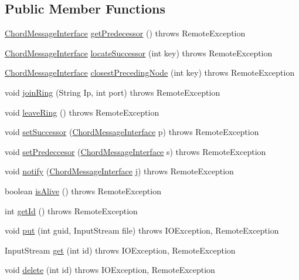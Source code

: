 \subsection*{Public Member Functions}
\begin{DoxyCompactItemize}
\item 
\hyperlink{interface_chord_message_interface}{Chord\+Message\+Interface} \hyperlink{interface_chord_message_interface_ab07c08ba6088ef880eaf4ebae8281c51}{get\+Predecessor} ()  throws Remote\+Exception
\item 
\hyperlink{interface_chord_message_interface}{Chord\+Message\+Interface} \hyperlink{interface_chord_message_interface_a4e299d4b05537a4a07965dfe9f261fd0}{locate\+Successor} (int key)  throws Remote\+Exception
\item 
\hyperlink{interface_chord_message_interface}{Chord\+Message\+Interface} \hyperlink{interface_chord_message_interface_a7f47e9d5144a2af6904135bc05dfe8fd}{closest\+Preceding\+Node} (int key)  throws Remote\+Exception
\item 
void \hyperlink{interface_chord_message_interface_abc5a9483416a6b8ae7330b324869e236}{join\+Ring} (String Ip, int port)  throws Remote\+Exception
\item 
void \hyperlink{interface_chord_message_interface_a6afa0f7ae38d68a936a85216fe33d5ae}{leave\+Ring} ()  throws Remote\+Exception
\item 
void \hyperlink{interface_chord_message_interface_af6194ad846851fe7a8bd5f6bc8d36163}{set\+Successor} (\hyperlink{interface_chord_message_interface}{Chord\+Message\+Interface} p)  throws Remote\+Exception
\item 
void \hyperlink{interface_chord_message_interface_a28e2eda3267e1eaa8abec8adcf2604bb}{set\+Predeccesor} (\hyperlink{interface_chord_message_interface}{Chord\+Message\+Interface} s)  throws Remote\+Exception
\item 
void \hyperlink{interface_chord_message_interface_abbb77f94541073d79284d35f970e0eb4}{notify} (\hyperlink{interface_chord_message_interface}{Chord\+Message\+Interface} j)  throws Remote\+Exception
\item 
boolean \hyperlink{interface_chord_message_interface_a8165b3fb53905e657c70b66223197561}{is\+Alive} ()  throws Remote\+Exception
\item 
int \hyperlink{interface_chord_message_interface_acead95d9a7196f05b656462ab78138eb}{get\+Id} ()  throws Remote\+Exception
\item 
void \hyperlink{interface_chord_message_interface_a59a01f2e913b6b2e4b60ba0b77c90eba}{put} (int guid, Input\+Stream file)  throws I\+O\+Exception, Remote\+Exception
\item 
Input\+Stream \hyperlink{interface_chord_message_interface_a4cdb461c48fe643f4fb5fa420d017eb3}{get} (int id)  throws I\+O\+Exception, Remote\+Exception
\item 
void \hyperlink{interface_chord_message_interface_ab4d46beae8cea347c827b5618ea16104}{delete} (int id)  throws I\+O\+Exception, Remote\+Exception
\end{DoxyCompactItemize}


